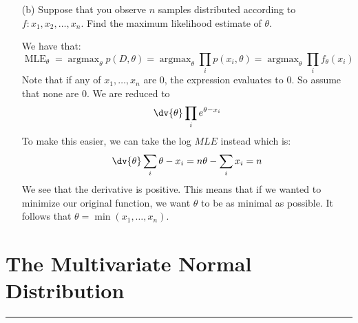 \documentclass{article}
\begin{document}
\begin{itemize}
            \item [(b)] Suppose that you observe $n$ samples distributed according to $f: x_{1}, x_{2}, \ldots, x_{n}$. Find the maximum likelihood estimate of $\theta$. 
                \begin{answer}
                    We have that:
                        \begin{equation*}
                            \mathop{MLE}_{\theta} = \mathop{argmax}_{\theta}p(D, \theta) = \mathop{argmax}_{\theta}\prod_{i} p(x_{i}, \theta) = \mathop{argmax}_{\theta}\prod_{i} f_{\theta}(x_{i})
                        \end{equation*}
                    Note that if any of $x_{1}, \ldots, x_{n}$ are $0$, the expression evaluates to $0$. So assume that none are $0$. We are reduced to
                        \begin{equation*}
                            \dv{\theta} \prod_{i} e^{\theta - x_{i}}
                        \end{equation*}
                    To make this easier, we can take the log $MLE$ instead which is:
                        \begin{equation*}
                            \dv{\theta} \sum_{i} \theta - x_{i} = n\theta - \sum_{i} x_{i} = n
                        \end{equation*}
                    We see that the derivative is positive. This means that if we wanted to minimize our original function, we want $\theta$ to be as minimal as possible. It follows that $\theta = \min(x_{1}, \ldots, x_{n})$.
                \end{answer}
        \end{itemize}

\newpage
\section*{The Multivariate Normal Distribution}
\hrule
\end{document}
